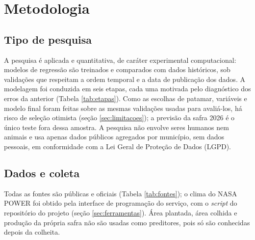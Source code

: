\documentclass[
	article,			%
	11pt,				%
	oneside,			%
	a4paper,			%
	english,			%
	brazil,				%
	sumario=tradicional
	]{abntex2}
\begin{document}
\section{Metodologia}\label{sec:metodologia}

\subsection{Tipo de pesquisa}

A pesquisa é aplicada e quantitativa, de caráter experimental computacional: modelos de regressão são treinados e comparados com dados históricos, sob validações que respeitam a ordem temporal e a data de publicação dos dados. A modelagem foi conduzida em seis etapas, cada uma motivada pelo diagnóstico dos erros da anterior (Tabela \ref{tab:etapas}). Como as escolhas de patamar, variáveis e modelo final foram feitas sobre as mesmas validações usadas para avaliá-los, há risco de seleção otimista (seção \ref{sec:limitacoes}); a previsão da safra 2026 é o único teste fora dessa amostra. A pesquisa não envolve seres humanos nem animais e usa apenas dados públicos agregados por município, sem dados pessoais, em conformidade com a Lei Geral de Proteção de Dados (LGPD).

\subsection{Dados e coleta}

Todas as fontes são públicas e oficiais (Tabela \ref{tab:fontes}); o clima do NASA POWER foi obtido pela interface de programação do serviço, com o \emph{script}  do repositório do projeto (seção \ref{sec:ferramentas}). Área plantada, área colhida e produção da própria safra não são usadas como preditores, pois só são conhecidas depois da colheita.
\end{document}
